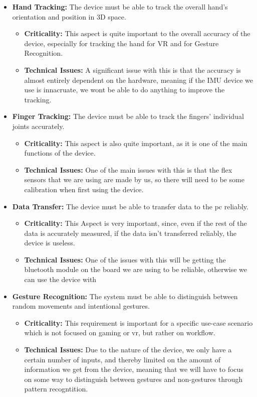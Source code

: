 \documentclass[12pt,a4paper,oneside]{book}
\theoremstyle{plain}
\numberwithin{equation}{chapter}
\begin{document}
\begin{itemize}
    \item \textbf{Hand Tracking:} The device must be able to track the overall hand's orientation and position in 3D space.
        \begin{itemize}
            \item \textbf{Criticality:} This aspect is quite important to the overall accuracy of the device, especially for tracking the hand for VR and for Gesture Recognition.
            \item \textbf{Technical Issues:} A significant issue with this is that the accuracy is almost entirely dependent on the hardware, meaning if the IMU device we use is innacruate, we wont be able to do anything to improve the tracking.
        \end{itemize}
    \item \textbf{Finger Tracking:} The device must be able to track the fingers' individual joints accurately.
        \begin{itemize}
            \item \textbf{Criticality:} This aspect is also quite important, as it is one of the main functions of the device.
            \item \textbf{Technical Issues:} One of the main issues with this is that the flex sensors that we are using are made by us, so there will need to be some calibration when first using the device.
        \end{itemize}
    \item \textbf{Data Transfer:} The device must be able to transfer data to the pc reliably.
        \begin{itemize}
            \item \textbf{Criticality:} This Aspect is very important, since, even if the rest of the data is accurately measured, if the data isn't transferred reliably, the device is useless.
            \item \textbf{Technical Issues:} One of the issues with this will be getting the bluetooth module on the board we are using to be reliable, otherwise we can use the device with
        \end{itemize}
    \item \textbf{Gesture Recognition:} The system must be able to distinguish between random movements and intentional gestures.
        \begin{itemize}
            \item \textbf{Criticality:} This requirement is important for a specific use-case scenario which is not focused on gaming or vr, but rather on workflow.
            \item \textbf{Technical Issues:} Due to the nature of the device, we only have a certain number of inputs, and thereby limited on the amount of information we get from the device, meaning that we will have to focus on some way to distinguish between gestures and non-gestures through pattern recogntition.
        \end{itemize}
\end{itemize}
\end{document}
